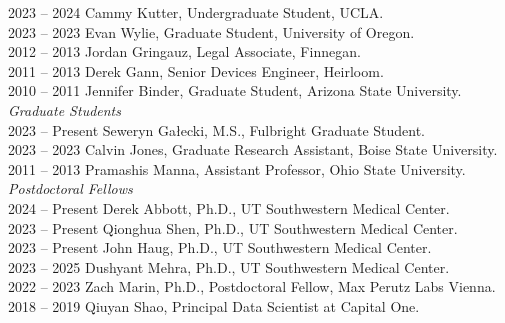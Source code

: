 2023 -- 2024 \hspace{28pt} Cammy Kutter, Undergraduate Student, UCLA. \\
2023 -- 2023 \hspace{28pt} Evan Wylie, Graduate Student, University of Oregon. \\
2012 -- 2013 \hspace{28pt} Jordan Gringauz, Legal Associate, Finnegan. \\
2011 -- 2013 \hspace{28pt} Derek Gann, Senior Devices Engineer, Heirloom. \\
2010 -- 2011 \hspace{28pt} Jennifer Binder, Graduate Student, Arizona State University. \\

\textit{Graduate Students} \\
2023 -- Present \hspace{14pt} Seweryn Gałecki, M.S., Fulbright Graduate Student. \\
2023 -- 2023 \hspace{28pt} Calvin Jones, Graduate Research Assistant, Boise State University. \\
2011 -- 2013 \hspace{28pt} Pramashis Manna, Assistant Professor, Ohio State University. \\

\textit{Postdoctoral Fellows} \\
2024 -- Present \hspace{14pt} Derek Abbott, Ph.D., UT Southwestern Medical Center. \\
2023 -- Present \hspace{14pt} Qionghua Shen, Ph.D., UT Southwestern Medical Center. \\
2023 -- Present \hspace{14pt} John Haug, Ph.D., UT Southwestern Medical Center. \\
2023 -- 2025 \hspace{28pt} Dushyant Mehra, Ph.D., UT Southwestern Medical Center. \\
2022 -- 2023 \hspace{28pt} Zach Marin, Ph.D., Postdoctoral Fellow, Max Perutz Labs Vienna. \\
2018 -- 2019 \hspace{28pt} Qiuyan Shao, Principal Data Scientist at Capital One. \\

